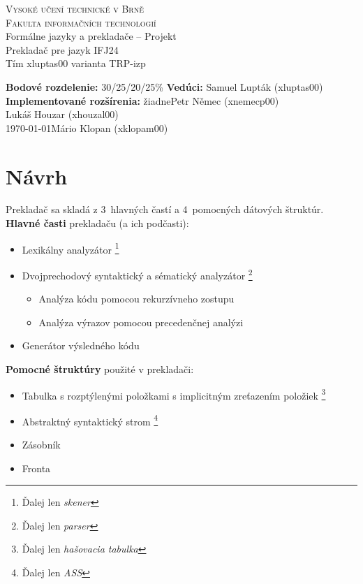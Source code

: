 \documentclass[Slovak, a4paper, 12pt]{article}
\begin{document}
	\begin{titlepage}
		
		\begin{center}
			\textsc{{\LARGE Vysoké učení technické v Brně \\[0.5em]}  {\LARGE Fakulta informačních technologií}} \\
			{\Large Formálne jazyky a prekladače  -- Projekt \\[0.6em]}
			{\huge Prekladač pre jazyk IFJ24} \\[0.6em]
			{\large Tím xluptas00 varianta TRP-izp}
			
		\end{center}
		\begin{flushright}
			{ \textbf{Bodové rozdelenie:} 30/25/20/25\% \hfill \textbf{Vedúci: }Samuel Lupták (xluptas00)} \\
			{ \textbf{Implementované rozšírenia:} žiadne\hfill  Petr Němec (xnemecp00)} \\
			{ \hfill  Lukáš Houzar (xhouzal00)} \\
			{\today \hfill Mário Klopan (xklopam00)}
		\end{flushright}
		
	\end{titlepage}
	
	\section{Návrh}
	\noindent Prekladač sa skladá z 3~hlavných častí a 4~pomocných dátových štruktúr.\\
	\textbf{Hlavné časti} prekladaču (a ich podčasti):
	\begin{itemize}
		\item Lexikálny analyzátor \footnote[1]{Ďalej len \textit{skener}}
		\item Dvojprechodový syntaktický a sématický analyzátor \footnote[2]{Ďalej len \textit{parser}}
		\begin{itemize} 
			\item Analýza kódu pomocou rekurzívneho zostupu
			\item Analýza výrazov pomocou precedenčnej analýzi 
		\end{itemize}
		\item Generátor výsledného kódu
	\end{itemize}
	
	\noindent\textbf{Pomocné štruktúry} použité v prekladači:
		\begin{itemize}
		\item  Tabulka s rozptýlenými položkami s implicitným zreťazením položiek \footnote[3]{Ďalej len \textit{hašovacia tabulka}}
		\item Abstraktný syntaktický strom \footnote[4]{Ďalej len \textit{ASS}}
		\item Zásobník
		\item Fronta
	\end{itemize}
	
\end{document}
